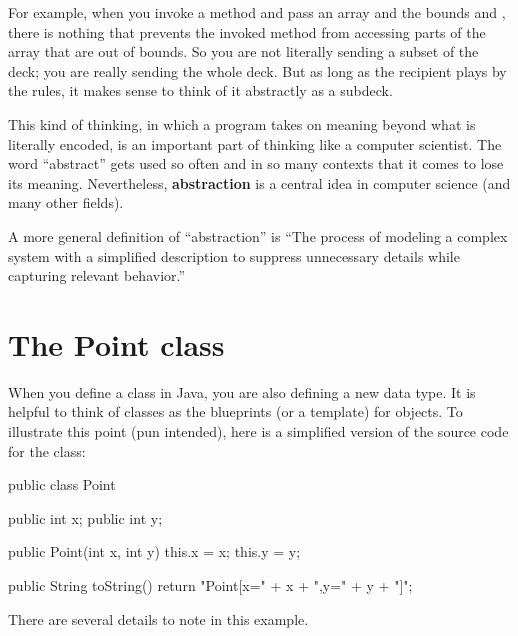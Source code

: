 For example, when you invoke a method and pass an array and the bounds  and , there is nothing that prevents the invoked method from accessing parts of the array that are out of bounds.
So you are not literally sending a subset of the deck; you are really sending the whole deck.
But as long as the recipient plays by the rules, it makes sense to think of it abstractly as a subdeck.

This kind of thinking, in which a program takes on meaning beyond what is literally encoded, is an important part of thinking like a computer scientist.
The word ``abstract'' gets used so often and in so many contexts that it comes to lose its meaning.
Nevertheless, {\bf abstraction} is a central idea in computer science (and many other fields).


A more general definition of ``abstraction'' is ``The process of modeling a complex system with a simplified description to suppress unnecessary details while capturing relevant behavior.''




\section{The Point class}

When you define a class in Java, you are also defining a new data type.
It is helpful to think of classes as the blueprints (or a template) for objects.
To illustrate this point (pun intended), here is a simplified version of the source code for the  class:

\begin{code}
public class Point {

    public int x;
    public int y;

    public Point(int x, int y) {
        this.x = x;
        this.y = y;
    }

    public String toString() {
        return "Point[x=" + x + ",y=" + y + "]";
    }

}
\end{code}

There are several details to note in this example.

